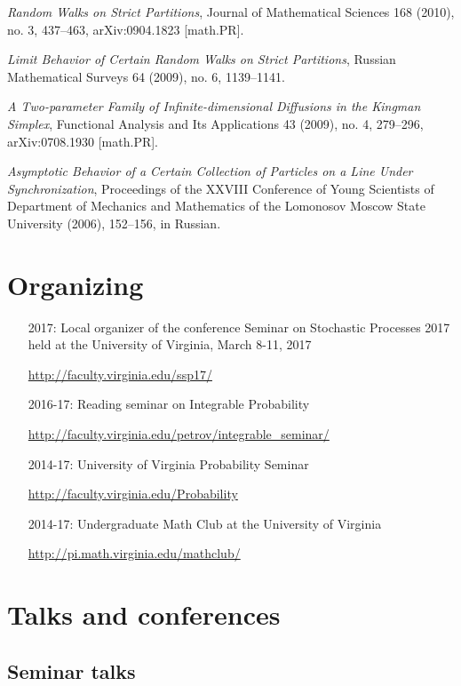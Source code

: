 \documentclass[letterpaper,11pt]{article}
\begin{document}
\begin{etaremune}
    \item  \emph{Random Walks on Strict Partitions}, Journal of Mathematical Sciences 168 (2010), no. 3, 437--463, arXiv:0904.1823 [math.PR].  
    \item  \emph{Limit Behavior of Certain Random Walks on Strict Partitions}, Russian Mathematical Surveys 64 (2009), no. 6, 1139--1141.
    \item  \emph{A Two-parameter Family of Infinite-dimensional Diffusions in the Kingman Simplex}, Functional Analysis and Its Applications 43 (2009), no. 4, 279--296, arXiv:0708.1930 [math.PR].
     \item 
    \emph{Asymptotic Behavior of a Certain Collection of Particles on a Line Under Synchronization}, Proceedings of the XXVIII Conference of Young Scientists of Department of Mechanics and Mathematics of the Lomonosov Moscow State University (2006), 152--156, in Russian.
\end{etaremune}

\section*{Organizing}

\begin{itemize}
	\item[2017:] Local organizer of the conference 
		Seminar on Stochastic Processes 2017 
		held at the University of Virginia, March 8-11, 2017

		\url{http://faculty.virginia.edu/ssp17/}
	\item[2016-17:]
		Reading seminar on Integrable Probability 

		\url{http://faculty.virginia.edu/petrov/integrable_seminar/}
	\item [2014-17:] University of Virginia Probability Seminar 

		\url{http://faculty.virginia.edu/Probability}
	\item[2014-17:]
		Undergraduate Math Club
		at the University of Virginia

		\url{http://pi.math.virginia.edu/mathclub/}
\end{itemize}



\section*{Talks and conferences}

\subsection*{Seminar talks}
\end{document}
